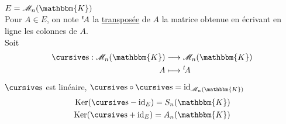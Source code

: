 \begin{exm}
	$E = \mathcal{M}_n(\mathbbm{K})$\\
	Pour $A \in E$, on note ${}^t\! A$ la \underline{transposée} de $A$ la matrice obtenue en écrivant en ligne les colonnes de $A$.\\
	Soit \begin{align*}
		\s: \mathcal{M}_{n}(\mathbbm{K}) &\longrightarrow \mathcal{M}_n(\mathbbm{K}) \\
		A &\longmapsto \t A
	\end{align*}
	$\s$ est linéaire, $\s \circ \s = \id_{\mathcal{M}_n(\mathbbm{K})}$\\
	\begin{align*}
		\Ker(\s - \id_E) = S_n(\mathbbm{K})\\
		\Ker(\s + \id_E) = A_n(\mathbbm{K})\\
	\end{align*}
\end{exm}












